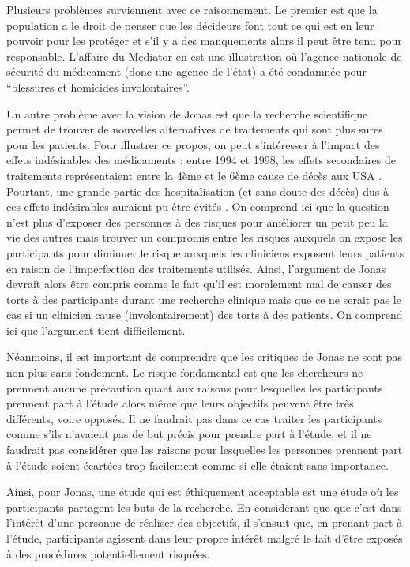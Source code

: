 \documentclass[
  12pt,
]{book}
\begin{document}
Plusieurs problèmes surviennent avec ce raisonnement. Le premier est que la population a le droit de penser que les décideurs font tout ce qui est en leur pouvoir pour les protéger et s'il y a des manquements alors il peut être tenu pour responsable. L'affaire du Mediator en est une illustration où l'agence nationale de sécurité du médicament (donc une agence de l'état) a été condamnée pour ``blessures et homicides involontaires''.

Un autre problème avec la vision de Jonas est que la recherche scientifique permet de trouver de nouvelles alternatives de traitements qui sont plus sures pour les patients. Pour illustrer ce propos, on peut s'intéresser à l'impact des effets indésirables des médicaments : entre 1994 et 1998, les effets secondaires de traitements représentaient entre la 4ème et le 6ème cause de décès aux USA \citep{Lazarou1998}. Pourtant, une grande partie des hospitalisation (et sans doute des décès) dus à ces effets indésirables auraient pu être évités \citep{Giardina2018}. On comprend ici que la question n'est plus d'exposer des personnes à des risques pour améliorer un petit peu la vie des autres mais trouver un compromis entre les risques auxquels on expose les participants pour diminuer le risque auxquels les cliniciens exposent leurs patients en raison de l'imperfection des traitements utilisés. Ainsi, l'argument de Jonas devrait alors être compris comme le fait qu'il est moralement mal de causer des torts à des participants durant une recherche clinique mais que ce ne serait pas le cas si un clinicien cause (involontairement) des torts à des patients. On comprend ici que l'argument tient difficilement.

Néanmoins, il est important de comprendre que les critiques de Jonas ne sont pas non plus sans fondement. Le risque fondamental est que les chercheurs ne prennent aucune précaution quant aux raisons pour lesquelles les participants prennent part à l'étude alors même que leurs objectifs peuvent être très différents, voire opposés. Il ne faudrait pas dans ce cas traiter les participants comme s'ils n'avaient pas de but précis pour prendre part à l'étude, et il ne faudrait pas considérer que les raisons pour lesquelles les personnes prennent part à l'étude soient écartées trop facilement comme si elle étaient sans importance.

Ainsi, pour Jonas, une étude qui est éthiquement acceptable est une étude où les participants partagent les buts de la recherche. En considérant que que c'est dans l'intérêt d'une personne de réaliser des objectifs, il s'ensuit que, en prenant part à l'étude, participants agissent dans leur propre intérêt malgré le fait d'être exposés à des procédures potentiellement risquées.
\end{document}

